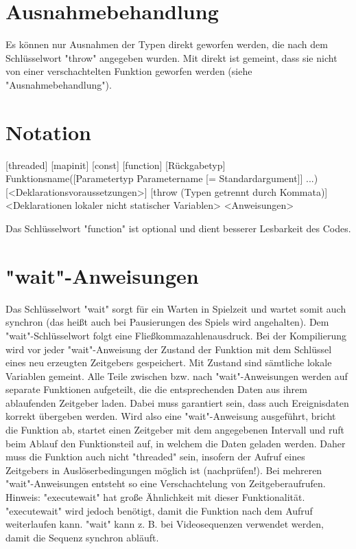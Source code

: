 \section{Ausnahmebehandlung}
Es können nur Ausnahmen der Typen direkt geworfen werden, die nach dem Schlüsselwort "throw" angegeben wurden.
Mit direkt ist gemeint, dass sie nicht von einer verschachtelten Funktion geworfen werden (siehe "Ausnahmebehandlung").

\section{Notation}
[threaded] [mapinit] [const] [function] [Rückgabetyp] Funktionsname([Parametertyp Parametername [= Standardargument]] ...) [<Deklarationsvoraussetzungen>] [throw (Typen getrennt durch Kommata)]
{
	<Deklarationen lokaler nicht statischer Variablen>
	<Anweisungen>
}

Das Schlüsselwort "function" ist optional und dient besserer Lesbarkeit des Codes.

\section{"wait"-Anweisungen}
Das Schlüsselwort "wait" sorgt für ein Warten in Spielzeit und wartet somit auch synchron (das heißt auch bei Pausierungen des Spiels wird angehalten).
Dem "wait"-Schlüsselwort folgt eine Fließkommazahlenausdruck. Bei der Kompilierung wird vor jeder "wait"-Anweisung der Zustand der Funktion mit dem Schlüssel eines neu erzeugten Zeitgebers gespeichert.
Mit Zustand sind sämtliche lokale Variablen gemeint.
Alle Teile zwischen bzw. nach "wait"-Anweisungen werden auf separate Funktionen aufgeteilt, die die entsprechenden Daten aus ihrem ablaufenden Zeitgeber laden.
Dabei muss garantiert sein, dass auch Ereignisdaten korrekt übergeben werden. Wird also eine "wait"-Anweisung ausgeführt, bricht die Funktion ab, startet einen Zeitgeber mit dem angegebenen Intervall und ruft beim Ablauf den Funktionsteil auf, in welchem die Daten geladen werden.
Daher muss die Funktion auch nicht "threaded" sein, insofern der Aufruf eines Zeitgebers in Auslöserbedingungen möglich ist (nachprüfen!).
Bei mehreren "wait"-Anweisungen entsteht so eine Verschachtelung von Zeitgeberaufrufen.
Hinweis: "executewait" hat große Ähnlichkeit mit dieser Funktionalität. "executewait" wird jedoch benötigt, damit die Funktion nach dem Aufruf weiterlaufen kann.
"wait" kann z. B. bei Videosequenzen verwendet werden, damit die Sequenz synchron abläuft.

